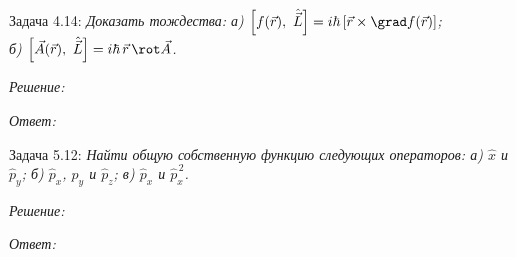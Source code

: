 \newpage

Задача 4.14: \emph{Доказать тождества:
а) \( \ds \comm{f(\vec{r})}{\hat{\vec{L}}} = i\h\left[\vec{r}\times\grad
f(\vec{r})\right] \);\\ б) \( \ds \comm{\vec{A}(\vec{r})}{\hat{\vec{L}}} =
i\h\,\vec{r}\,\rot\vec{A} \).}

\vspace*{2em}
\emph{Решение:}

\vspace*{2em}
\emph{Ответ:}

\newpage

Задача 5.12: \emph{Найти общую собственную функцию следующих операторов:
а) \( \hat{x} \) и \( \hat{p}_y \); б) \( \hat{p}_x \), \( \hat{p}_y \) и
\( \hat{p}_z \); в) \( \hat{p}_x \) и \( \hat{p}_x^{\,2} \).}

\vspace*{2em}
\emph{Решение:}

\vspace*{2em}
\emph{Ответ:}
